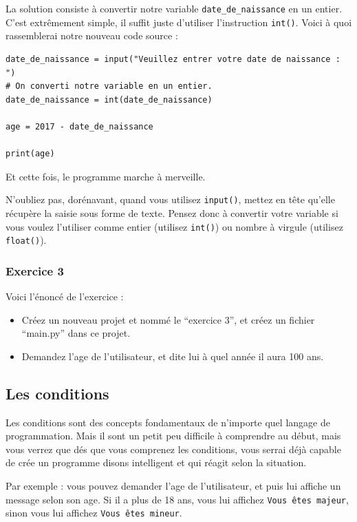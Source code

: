 \documentclass[12pt]{article}
\newcommand{\code}[1]{\colorbox{light-gray}{\texttt{#1}}}
\begin{document}
            La solution consiste à convertir notre variable \code{date\_de\_naissance} en un entier. C'est extrêmement 
            simple, il suffit juste d'utiliser l'instruction \code{int()}. Voici à quoi rassemblerai notre nouveau
            code source :
            \begin{lstlisting}[style=code, breaklines=false]
date_de_naissance = input("Veuillez entrer votre date de naissance : ")
# On converti notre variable en un entier.
date_de_naissance = int(date_de_naissance)

age = 2017 - date_de_naissance

print(age) 
            \end{lstlisting}

            Et cette fois, le programme marche à merveille. 

            N'oubliez pas, dorénavant, quand vous utilisez \code{input()},
            mettez en tête qu'elle récupère la saisie sous forme de texte. Pensez donc à convertir votre variable si 
            vous voulez l'utiliser comme entier (utilisez \code{int()}) ou nombre à virgule (utilisez \code{float()}).

        \subsubsection{Exercice 3}
            Voici l'énoncé de l'exercice :
            \begin{itemize}
                \item Créez un nouveau projet et nommé le ``exercice 3'', et créez un fichier ``main.py'' dans ce
                    projet.
                \item Demandez l'age de l'utilisateur, et dite lui à quel année il aura 100 ans.
            \end{itemize}

\clearpage

    \subsection{Les conditions}
        Les conditions sont des concepts fondamentaux de n'importe quel langage de programmation. Mais il sont un petit 
        peu difficile à comprendre au début, mais vous verrez que dés que vous comprenez les conditions, vous serrai 
        déjà capable de crée un programme disons intelligent et qui réagit selon la situation. 

        Par exemple : vous pouvez demander l'age de l'utilisateur, et puis lui affiche un message selon son age. Si il a 
        plus de 18 ans, vous lui affichez \code{Vous êtes majeur}, sinon vous lui affichez \code{Vous êtes mineur}.
\end{document}
